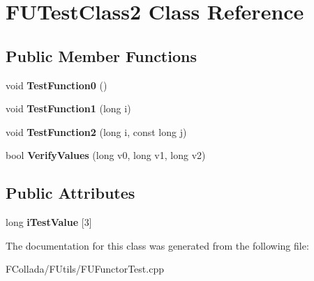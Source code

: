 \hypertarget{classFUTestClass2}{
\section{FUTestClass2 Class Reference}
\label{classFUTestClass2}
}
\subsection*{Public Member Functions}
\begin{DoxyCompactItemize}
\item 
\hypertarget{classFUTestClass2_a266da84a3a207231a61294479ed6a7ff}{
void {\bfseries TestFunction0} ()}
\label{classFUTestClass2_a266da84a3a207231a61294479ed6a7ff}

\item 
\hypertarget{classFUTestClass2_a0be394557ab299e2519673e748942ba2}{
void {\bfseries TestFunction1} (long i)}
\label{classFUTestClass2_a0be394557ab299e2519673e748942ba2}

\item 
\hypertarget{classFUTestClass2_a5deb570cf1ba7bed93f37b4d53519a43}{
void {\bfseries TestFunction2} (long i, const long j)}
\label{classFUTestClass2_a5deb570cf1ba7bed93f37b4d53519a43}

\item 
\hypertarget{classFUTestClass2_a2797e12c40e748a353edd6346283dab7}{
bool {\bfseries VerifyValues} (long v0, long v1, long v2)}
\label{classFUTestClass2_a2797e12c40e748a353edd6346283dab7}

\end{DoxyCompactItemize}
\subsection*{Public Attributes}
\begin{DoxyCompactItemize}
\item 
\hypertarget{classFUTestClass2_a0194bbbac02ecc4f34968018d7bc5738}{
long {\bfseries iTestValue} \mbox{[}3\mbox{]}}
\label{classFUTestClass2_a0194bbbac02ecc4f34968018d7bc5738}

\end{DoxyCompactItemize}


The documentation for this class was generated from the following file:\begin{DoxyCompactItemize}
\item 
FCollada/FUtils/FUFunctorTest.cpp\end{DoxyCompactItemize}
